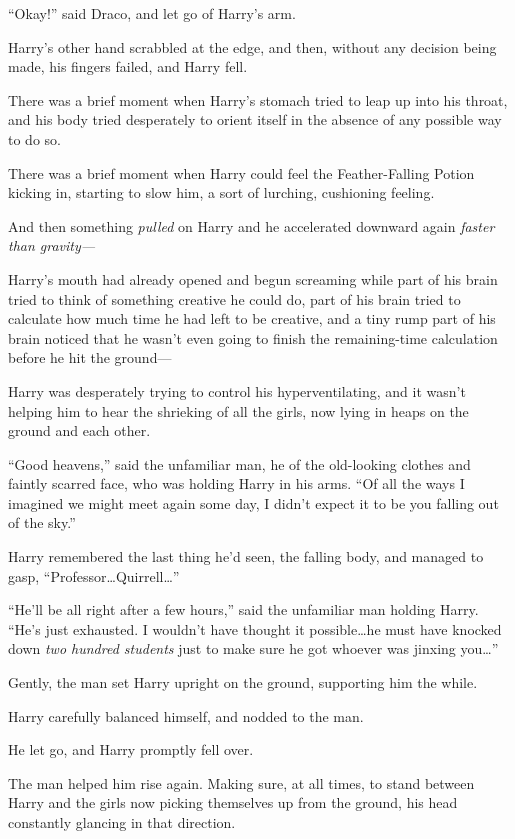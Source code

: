 “Okay!” said Draco, and let go of Harry’s arm.

Harry’s other hand scrabbled at the edge, and then, without any decision being made, his fingers failed, and Harry fell.

There was a brief moment when Harry’s stomach tried to leap up into his throat, and his body tried desperately to orient itself in the absence of any possible way to do so.

There was a brief moment when Harry could feel the Feather-Falling Potion kicking in, starting to slow him, a sort of lurching, cushioning feeling.

And then something \emph{pulled} on Harry and he accelerated downward again \emph{faster than gravity—}

Harry’s mouth had already opened and begun screaming while part of his brain tried to think of something creative he could do, part of his brain tried to calculate how much time he had left to be creative, and a tiny rump part of his brain noticed that he wasn’t even going to finish the remaining-time calculation before he hit the ground—

\later

Harry was desperately trying to control his hyperventilating, and it wasn’t helping him to hear the shrieking of all the girls, now lying in heaps on the ground and each other.

“Good heavens,” said the unfamiliar man, he of the old-looking clothes and faintly scarred face, who was holding Harry in his arms.
“Of all the ways I imagined we might meet again some day, I didn’t expect it to be you falling out of the sky.”

Harry remembered the last thing he’d seen, the falling body, and managed to gasp,
“Professor…Quirrell…”

“He’ll be all right after a few hours,” said the unfamiliar man holding Harry.
“He’s just exhausted. I wouldn’t have thought it possible…he must have knocked down \emph{two hundred students} just to make sure he got whoever was jinxing you…”

Gently, the man set Harry upright on the ground, supporting him the while.

Harry carefully balanced himself, and nodded to the man.

He let go, and Harry promptly fell over.

The man helped him rise again. Making sure, at all times, to stand between Harry and the girls now picking themselves up from the ground, his head constantly glancing in that direction.

